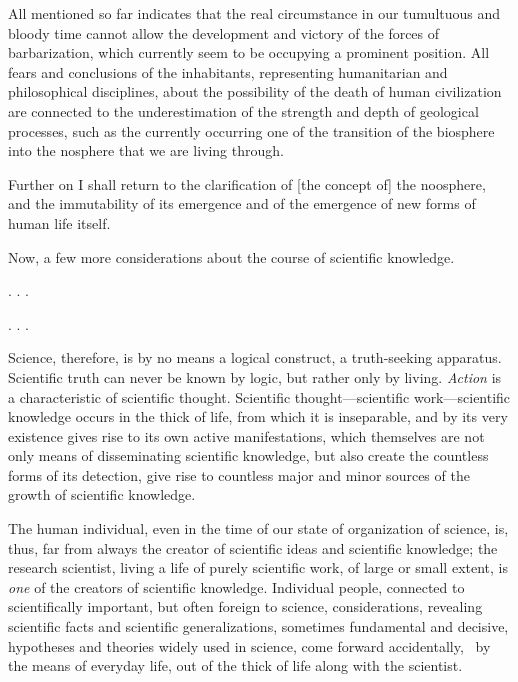 All mentioned so far indicates that the real circumstance in our tumultuous and
bloody time cannot allow the development and victory of the forces of
barbarization, which currently seem to be occupying a prominent position.  All
fears and conclusions of the inhabitants, representing humanitarian and
philosophical disciplines, about the possibility of the death of human
civilization are connected to the underestimation of the strength and depth of
geological processes, such as the currently occurring one of the transition of
the biosphere into the nosphere that we are living through.

Further on I shall return to the clarification of [the concept of] the
noosphere, and the immutability of its emergence and of the emergence of new
forms of human life itself.

Now, a few more considerations about the course of scientific knowledge.


\Section %

. . .

\Section %

. . .

\Section %
Science, therefore, is by no means a logical construct, a truth-seeking
apparatus.  Scientific truth can never be known by logic, but rather only by
living.  \emph{Action }is a characteristic of scientific thought.  Scientific
thought---scientific work---scientific knowledge occurs in the thick of life,
from which it is inseparable, and by its very existence gives rise to its own
active manifestations, which themselves are not only means of disseminating
scientific knowledge, but also create the countless forms of its detection,
give rise to countless major and minor sources of the growth of scientific
knowledge.

The human individual, even in the time of our state of organization of science,
is, thus, far from always the creator of scientific ideas and scientific
knowledge; the research scientist, living a life of purely scientific work, of
large or small extent, is \emph{one} of the creators of scientific knowledge.
Individual people, connected to scientifically important, but often foreign to
science, considerations, revealing scientific facts and scientific
generalizations, sometimes fundamental and decisive, hypotheses and theories
widely used in science, come forward accidentally, \ie\ by the means of
everyday life, out of the thick of life along with the scientist.

